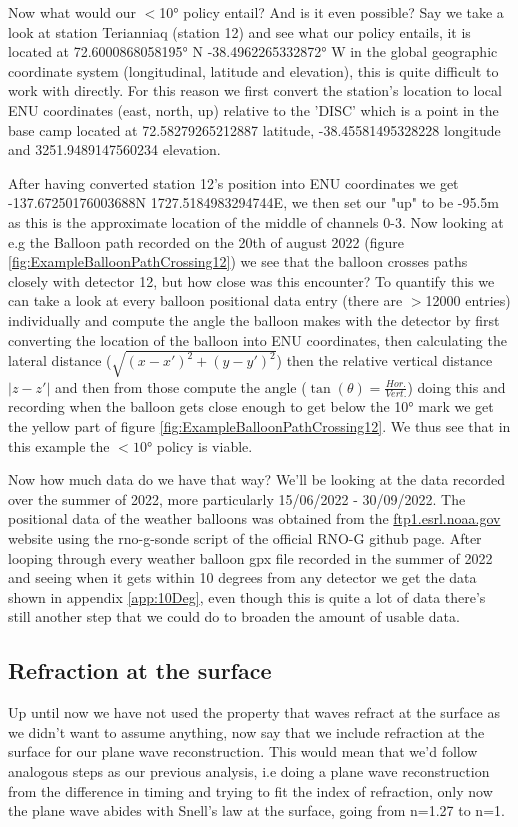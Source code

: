 Now what would our $<$10° policy entail? And is it even possible?  Say we take
a look at station Terianniaq (station 12) and see what our policy entails,
it is located at 72.6000868058195° N -38.4962265332872° W in the global geographic
coordinate system (longitudinal, latitude and elevation), this is quite
difficult to work with directly. For this reason we first convert the station's location to 
local ENU coordinates (east, north, up) relative to the 'DISC' which is a point in the base camp located at
72.58279265212887 latitude, -38.45581495328228 longitude and 3251.9489147560234 elevation.  

After having converted station 12's position into ENU coordinates we get
-137.67250176003688N 1727.5184983294744E, we then set our "up" to be -95.5m as
this is the approximate location of the middle of channels 0-3.  Now looking at
e.g the Balloon path recorded on the 20th of august 2022 (figure
\ref{fig:ExampleBalloonPathCrossing12}) we see that the balloon crosses paths
closely with detector 12, but how close was this encounter? To quantify this we
can take a look at every balloon positional data entry (there are $>$12000
entries) individually and compute the angle the balloon makes with the detector
by first converting the location of the balloon into ENU coordinates, then
calculating the lateral distance ($\sqrt{(x-x')^2 + (y-y')^2}$) then the
relative vertical distance $|z - z'|$ and then from those compute the angle
($\tan(\theta) = \frac{Hor.}{Vert.}$) doing this and recording when the balloon
gets close enough to get below the 10° mark we get the yellow part of figure
\ref{fig:ExampleBalloonPathCrossing12}. We thus see that in this
example the $<10$° policy is viable.

Now how much data do we have that way? 
We'll be looking at the data recorded over the summer of
2022, more particularly 15/06/2022 - 30/09/2022.
The positional data of the weather balloons was obtained from the
\url{ftp1.esrl.noaa.gov} website using the rno-g-sonde script of the official
RNO-G github page. After looping through every weather
balloon gpx file recorded in the summer of 2022 and seeing when it gets
within 10 degrees from any detector we get the data shown in appendix \ref{app:10Deg}, even
though this is quite a lot of data there's still another step that we could do
to broaden the amount of usable data.
\subsection{Refraction at the surface}
Up until now we have not used the property that waves refract at the surface as
we didn't want to assume anything, now say that we include refraction at the
surface for our plane wave reconstruction. This would mean that we'd follow
analogous steps as our previous analysis, i.e doing a plane wave reconstruction
from the difference in timing and trying to fit the index of refraction, only
now the plane wave abides with Snell's law at the surface, going from n=1.27 to
n=1. 

